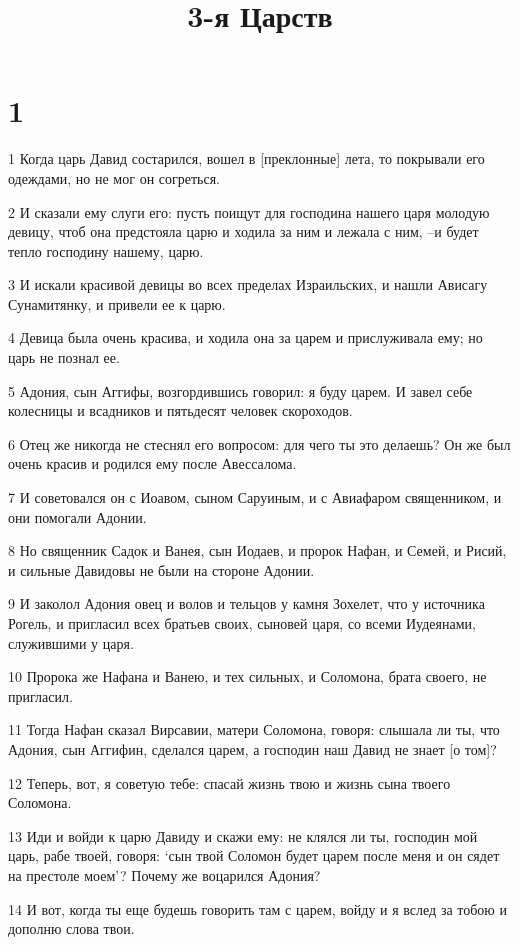 

\title{3-я Царств}


\chapter{1}

\par 1 Когда царь Давид состарился, вошел в [преклонные] лета, то покрывали его одеждами, но не мог он согреться.
\par 2 И сказали ему слуги его: пусть поищут для господина нашего царя молодую девицу, чтоб она предстояла царю и ходила за ним и лежала с ним, --и будет тепло господину нашему, царю.
\par 3 И искали красивой девицы во всех пределах Израильских, и нашли Ависагу Сунамитянку, и привели ее к царю.
\par 4 Девица была очень красива, и ходила она за царем и прислуживала ему; но царь не познал ее.
\par 5 Адония, сын Аггифы, возгордившись говорил: я буду царем. И завел себе колесницы и всадников и пятьдесят человек скороходов.
\par 6 Отец же никогда не стеснял его вопросом: для чего ты это делаешь? Он же был очень красив и родился ему после Авессалома.
\par 7 И советовался он с Иоавом, сыном Саруиным, и с Авиафаром священником, и они помогали Адонии.
\par 8 Но священник Садок и Ванея, сын Иодаев, и пророк Нафан, и Семей, и Рисий, и сильные Давидовы не были на стороне Адонии.
\par 9 И заколол Адония овец и волов и тельцов у камня Зохелет, что у источника Рогель, и пригласил всех братьев своих, сыновей царя, со всеми Иудеянами, служившими у царя.
\par 10 Пророка же Нафана и Ванею, и тех сильных, и Соломона, брата своего, не пригласил.
\par 11 Тогда Нафан сказал Вирсавии, матери Соломона, говоря: слышала ли ты, что Адония, сын Аггифин, сделался царем, а господин наш Давид не знает [о том]?
\par 12 Теперь, вот, я советую тебе: спасай жизнь твою и жизнь сына твоего Соломона.
\par 13 Иди и войди к царю Давиду и скажи ему: не клялся ли ты, господин мой царь, рабе твоей, говоря: `сын твой Соломон будет царем после меня и он сядет на престоле моем'? Почему же воцарился Адония?
\par 14 И вот, когда ты еще будешь говорить там с царем, войду и я вслед за тобою и дополню слова твои.
